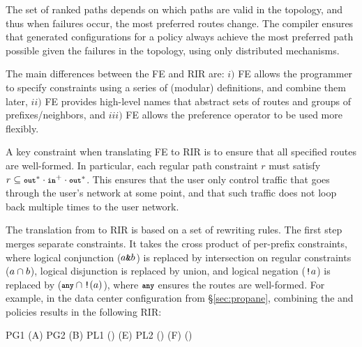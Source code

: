 The set of ranked paths depends on which paths are valid in the topology, and thus when failures occur, the most preferred routes change. The \sysname compiler ensures that generated configurations for a policy always achieve the most preferred path possible given the failures in the topology, using only distributed mechanisms.



The main differences between the FE and RIR are: $i)$ FE allows the programmer to specify constraints using a series of (modular) definitions, and combine them later, $ii)$ FE provides high-level names that abstract sets of routes and groups of prefixes/neighbors, and $iii)$ FE allows the preference operator to be used more flexibly.

A key constraint when translating FE to RIR is to ensure that all specified routes are well-formed. In particular, each regular path constraint $r$ must satisfy $r \subseteq \Out^* \cdot \In^+ \cdot \Out^*$. This ensures that the user only control traffic that goes through the user's network at some point, and that such traffic does not loop back multiple times to the user network.

The translation from \sysname to RIR is based on a set of rewriting rules.
The first step merges separate constraints. It takes the cross product of per-prefix constraints, where logical conjunction ($a \texttt{\&} b$) is replaced by intersection on regular constraints ($a \cap b$), logical disjunction is replaced by union, and logical negation ($\texttt{!} a$) is replaced by ($\Any \cap \NOT(a)$), where $\Any$ ensures the routes are well-formed.
%
For example, in the data center configuration from \S\ref{sec:propane}, combining the  and  policies results in the following RIR:


\begin{code}
PG1 \Path \Any \Intersect \End(A)
PG2 \Path \Any \Intersect \End(B)
PL1 \Path \NOT\Enter(\Out) \Intersect \End(E)
PL2 \Path \NOT\Enter(\Out) \Intersect \End(F)
\True \Path \Exit(\Out)
\end{code}

